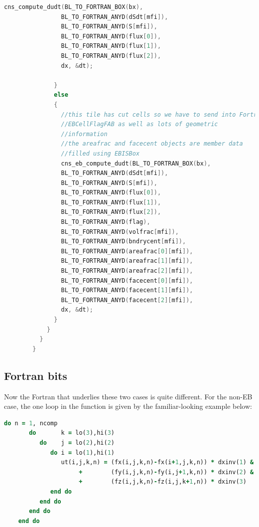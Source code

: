 \begin{lstlisting}[language=cpp]
                cns_compute_dudt(BL_TO_FORTRAN_BOX(bx),
                BL_TO_FORTRAN_ANYD(dSdt[mfi]),
                BL_TO_FORTRAN_ANYD(S[mfi]),
                BL_TO_FORTRAN_ANYD(flux[0]),
                BL_TO_FORTRAN_ANYD(flux[1]),
                BL_TO_FORTRAN_ANYD(flux[2]),
                dx, &dt);

              }
              else
              {
                //this tile has cut cells so we have to send into Fortran
                //EBCellFlagFAB as well as lots of geometric
                //information
                //the areafrac and facecent objects are member data
                //filled using EBISBox
                cns_eb_compute_dudt(BL_TO_FORTRAN_BOX(bx),
                BL_TO_FORTRAN_ANYD(dSdt[mfi]),
                BL_TO_FORTRAN_ANYD(S[mfi]),
                BL_TO_FORTRAN_ANYD(flux[0]),
                BL_TO_FORTRAN_ANYD(flux[1]),
                BL_TO_FORTRAN_ANYD(flux[2]),
                BL_TO_FORTRAN_ANYD(flag),
                BL_TO_FORTRAN_ANYD(volfrac[mfi]),
                BL_TO_FORTRAN_ANYD(bndrycent[mfi]),
                BL_TO_FORTRAN_ANYD(areafrac[0][mfi]),
                BL_TO_FORTRAN_ANYD(areafrac[1][mfi]),
                BL_TO_FORTRAN_ANYD(areafrac[2][mfi]),
                BL_TO_FORTRAN_ANYD(facecent[0][mfi]),
                BL_TO_FORTRAN_ANYD(facecent[1][mfi]),
                BL_TO_FORTRAN_ANYD(facecent[2][mfi]),
                dx, &dt);
              }
            }
          }
        }

\end{lstlisting}

\subsection{Fortran bits}

Now the Fortran that underlies these two cases is quite different.
For the non-EB case,    the one loop in the function is given by the
familiar-looking example below:
\begin{lstlisting}[language=Fortran]
    do n = 1, ncomp
       do       k = lo(3),hi(3)
          do    j = lo(2),hi(2)
             do i = lo(1),hi(1)
                ut(i,j,k,n) = (fx(i,j,k,n)-fx(i+1,j,k,n)) * dxinv(1) &
                     +        (fy(i,j,k,n)-fy(i,j+1,k,n)) * dxinv(2) &
                     +        (fz(i,j,k,n)-fz(i,j,k+1,n)) * dxinv(3)
             end do
          end do
       end do
    end do
\end{lstlisting}

